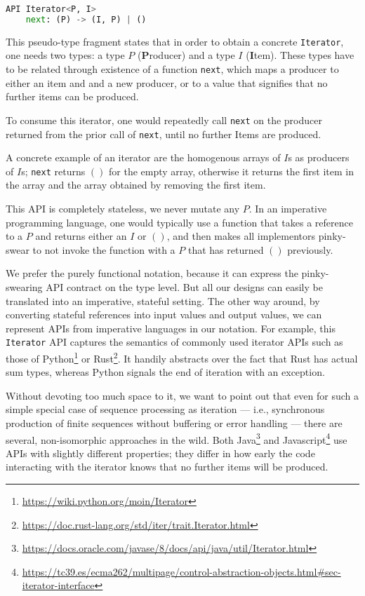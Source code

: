 \documentclass[sigplan,screen,10pt,anonymous,review]{acmart}
\begin{document}
\begin{lstlisting}[language=Python]
API Iterator<P, I>
    next: (P) -> (I, P) | ()
\end{lstlisting}

This pseudo-type fragment states that in order to obtain a concrete \texttt{Iterator}, one needs two types: a type $P$ (\textbf{P}roducer) and a type $I$ (\textbf{I}tem). These types have to be related through existence of a function \texttt{next}, which maps a producer to either an item and and a new producer, or to a value that signifies that no further items can be produced.

To consume this iterator, one would repeatedly call \texttt{next} on the producer returned from the prior call of \texttt{next}, until no further Items are produced.

A concrete example of an iterator are the homogenous arrays of $I$s as producers of $I$s; \texttt{next} returns $()$ for the empty array, otherwise it returns the first item in the array and the array obtained by removing the first item.

This API is completely stateless, we never mutate any $P$. In an imperative programming language, one would typically use a function that takes a reference to a $P$ and returns either an $I$ or $()$, and then makes all implementors pinky-swear to not invoke the function with a $P$ that has returned $()$ previously.

We prefer the purely functional notation, because it can express the pinky-swearing API contract on the type level. But all our designs can easily be translated into an imperative, stateful setting. The other way around, by converting stateful references into input values and output values, we can represent APIs from imperative languages in our notation. For example, this \texttt{Iterator} API captures the semantics of commonly used iterator APIs such as those of Python\footnote{\url{https://wiki.python.org/moin/Iterator}} or Rust\footnote{\url{https://doc.rust-lang.org/std/iter/trait.Iterator.html}}. It handily abstracts over the fact that Rust has actual sum types, whereas Python signals the end of iteration with an exception.

Without devoting too much space to it, we want to point out that even for such a simple special case of sequence processing as iteration --- i.e., synchronous production of finite sequences without buffering or error handling --- there are several, non-isomorphic approaches in the wild. Both Java\footnote{\url{https://docs.oracle.com/javase/8/docs/api/java/util/Iterator.html}} and Javascript\footnote{\url{https://tc39.es/ecma262/multipage/control-abstraction-objects.html\#sec-iterator-interface}} use APIs with slightly different properties; they differ in how early the code interacting with the iterator knows that no further items will be produced.
\end{document}
